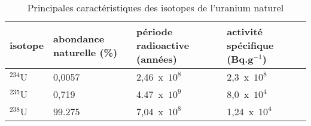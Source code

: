 \documentclass[12pt,a4paper]{article}
\begin{document}
\begin{center}
	\begin{table}[h]
		\caption{Principales caractéristiques des isotopes de l'uranium naturel} \label{unat}
		\begin{tabular}{x{.10\linewidth} x{.25\linewidth}  x{.25\linewidth} x{.25\linewidth}} \\
			\toprule[.4mm]
			isotope   & abondance naturelle (\%) & période radioactive (années) & activité spécifique (Bq.g$^{-1}$) \tabularnewline\midrule
			$^{234}$U & 0,0057                   & 2,46~x~$10^8$                & 2,3~x~$10^8$ \tabularnewline
			$^{235}$U & 0,719                    & 4.47~x~$10^9$                & 8,0~x~$10^4$ \tabularnewline
			$^{238}$U & 99.275                   & 7,04~x~$10^8$                & 1,24~x~$10^4$\tabularnewline
			\bottomrule[.4mm]
		\end{tabular}
	\end{table}
\end{center}
\end{document}
